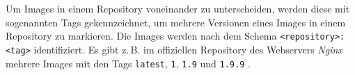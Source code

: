 \documentclass[../main.tex]{subfiles}
\begin{document}
			Um Images in einem Repository voneinander zu unterscheiden, werden diese mit sogenannten Tags gekennzeichnet, um mehrere Versionen eines Images in einem Repository zu markieren. Die Images werden nach dem Schema \texttt{<repository>:<tag>} identifiziert. Es gibt z.\,B. im offiziellen Repository des Webservers \emph{Nginx} mehrere Images mit den Tags \texttt{latest}, \texttt{1}, \texttt{1.9} und \texttt{1.9.9} \cite{dockerHubNginx}.




\end{document}
